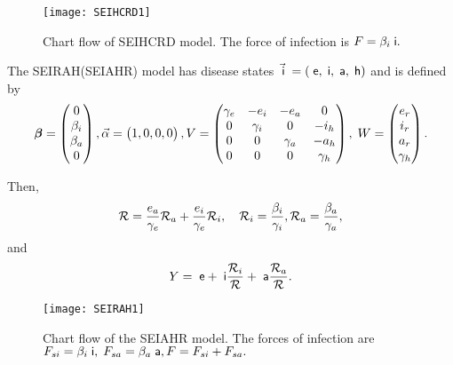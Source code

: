  \begin{figure}[H]
\centering
\texttt{[image: SEIHCRD1]}
\caption{Chart flow of SEIHCRD model. %
The force of infection  is $ F=\beta_i \;\mathsf i.$
\label{f:SEIHCRD}}
\end{figure}
\eeXa

\beXa The SEIRAH(SEIAHR) model  \cite{%
deng2021extended,prague2020population} has disease states $\vec {\;\mathsf i} \;  =(\;\mathsf e , \;\mathsf i, \; \mathsf a,\; \mathsf h)$ and
is defined by $${\mbox{\boldmath$\beta$}}=\begin{pmatrix} 0\\\beta_i\\\beta_a\\0\end{pmatrix}, \vec \alpha=\begin{pmatrix} 1,0,0,0\end{pmatrix}, V=
\begin{pmatrix}
 \gamma_e  & -e_i &-e_a  & 0 \\
 0 & \gamma_i  &0& -i_h \\
 0 & 0& \gamma_a &-a_h \\
 0 & 0 &0& \gamma_h \\
\end{pmatrix},\;  W =\begin{pmatrix} e_r\\i_r\\ a_r \\ \gamma_h \end{pmatrix}.$$

Then, $$\mathcal R=\frac{ e_a}{\gamma _e } \mathcal R _a +\frac{e_i }{\gamma _e } \mathcal R _i, \quad {\mathcal R_i }=\frac{\beta _i }{\gamma_i}, {\mathcal R _a }=\frac{\beta _a }{\gamma_a},$$ %
and $$ Y=\;\mathsf e+\;\mathsf i \frac{\mathcal R _i }{\mathcal R}+\; \mathsf a \frac{\mathcal R _a }{\mathcal R}.$$
   \begin{figure}[H]
\centering
\texttt{[image: SEIRAH1]}
\caption{Chart flow of the SEIAHR model. %
The forces of infection  are $F_{si}= \beta_i \;\mathsf i,\; F_{sa}= \beta_a \; \mathsf a  , F=F_{si}+F_{sa}.$
\label{f:SEIRAH}}
\end{figure} \eeXa

